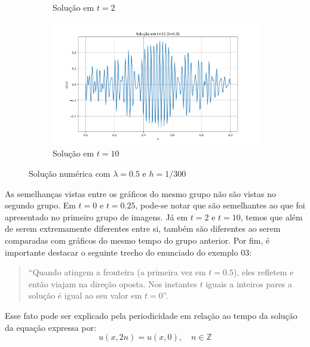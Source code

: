 \documentclass[column,amsmath,amssymb,floatfix]{revtex4}
\begin{document}
\begin{figure}[H]
\begin{subfigure}{0.35\textwidth}
		\caption{Solução em $t=2$}
		\label{fig:ex3_7}
	\end{subfigure}
	\begin{subfigure}{0.35\textwidth}
		\includegraphics[width=\textwidth]{img/ex0308.png}
		\caption{Solução em $t=10$}
		\label{fig:ex3_8}
	\end{subfigure}
	\caption{Solução numérica com $\lambda=0.5$ e $h=1/300$}
	\label{fig:ex3_lambda05}
\end{figure}

As semelhanças vistas entre os gráficos do mesmo grupo não são vistas no segundo grupo. Em $t=0$ e $t=0.25$, pode-se notar que são semelhantes ao que foi apresentado no primeiro grupo de imagens. Já em $t=2$ e $t=10$, temos que além de serem extremamente diferentes entre si, também são diferentes ao serem comparadas com gráficos do mesmo tempo do grupo anterior. Por fim, é importante destacar o seguinte trecho do enunciado do exemplo 03:
\begin{quote}
	``Quando atingem a fronteira (a primeira vez em $t = 0.5$), eles refletem e então viajam na direção oposta. Nos instantes $t$ iguais a inteiros pares a solução é igual ao seu valor em $t = 0$''. 
\end{quote}

Esse fato pode ser explicado pela periodicidade em relação ao tempo da solução da equação expressa por:
\begin{equation*}
	u(x,2n) = u(x,0), \quad n \in \mathbb{Z}
\end{equation*}
\end{document}
